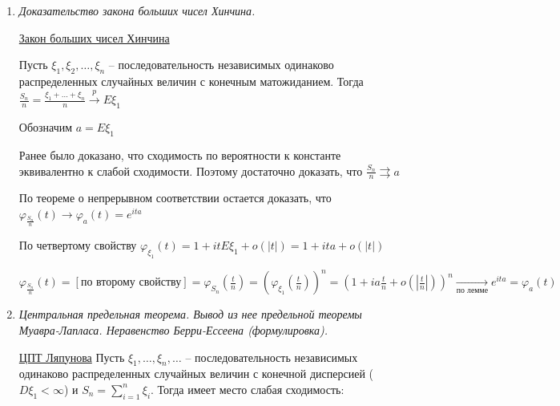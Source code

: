 \begin{enumerate}
\begin{itemize}
        $\xi \in N(a, \sigma^2)$

        $\varphi_\xi(t) = e^{ita} \varphi_\eta(\sigma t) = e^{ita - \frac{\sigma^2t^2}{2}}$

        \underline{Следствие}: нормальное распределение устойчиво относительно суммирования: если $\xi \in N(a_1, \sigma_1^2), \eta \in N(a_2, \sigma^2_2)$ и они независимы, то $\xi + \eta \in N(a_1 + a_2, \sigma_1^2 + \sigma_2^2)$

    \end{itemize}

    \item \textit{Доказательство закона больших чисел Хинчина.}

    \hyperlink{lawofbignumberskhinchin2}{Закон больших чисел Хинчина}
    
    Пусть $\xi_1, \xi_2, \dots, \xi_n$ -- последовательность независимых одинаково распределенных случайных величин с конечным матожиданием.
    Тогда $\frac{S_n}{n} = \frac{\xi_1 + \dots + \xi_n}{n} \overset{p}{\longrightarrow} E\xi_1$
    
    \begin{MyProof}
        Обозначим $a = E\xi_1$
    
        Ранее было доказано, что сходимость по вероятности к константе эквивалентно к слабой сходимости. Поэтому достаточно доказать, что $\frac{S_n}{n} \rightrightarrows a$
    
        По теореме о непрерывном соответствии остается доказать, что $\varphi_{\frac{S_n}{n}}(t) \longrightarrow \varphi_a(t) = e^{ita}$
    
        По четвертому свойству $\varphi_{\xi_1}(t) = 1 + itE\xi_1 + o(|t|) = 1 + ita + o(|t|)$
    
        $\varphi_{\frac{S_n}{n}}(t) = [\text{по второму свойству}] = \varphi_{S_n}\left(\frac{t}{n}\right) = \left(\varphi_{\xi_1}\left(\frac{t}{n}\right)\right)^n = \left(1 + ia\frac{t}{n} + o\left(\left|\frac{t}{n}\right|\right)\right)^n \underset{\text{по лемме}}{\longrightarrow}
        e^{ita} = \varphi_a(t)$
    \end{MyProof}

    \item \textit{Центральная предельная теорема. Вывод из нее предельной теоремы Муавра-Лапласа. Неравенство Берри-Ессеена (формулировка). }

    \hyperlink{centrallimittheorem}{ЦПТ Ляпунова} \Ths Пусть $\xi_1, \dots, \xi_n, \dots$ -- последовательность независимых одинаково распределенных случайных величин
    с конечной дисперсией ($D\xi_1 < \infty$) и $S_n = \sum_{i = 1}^n \xi_i$. Тогда имеет место слабая сходимость:


\end{enumerate}
